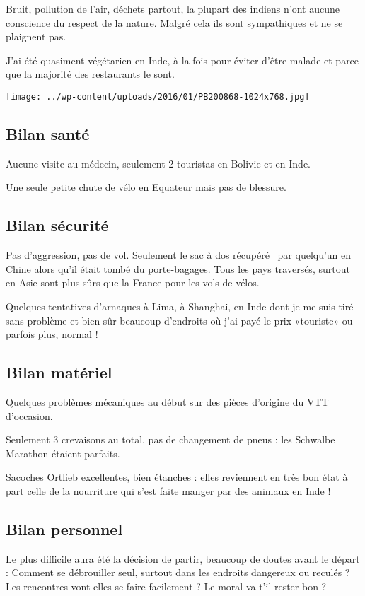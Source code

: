  Bruit, pollution de l'air, déchets partout, la plupart des indiens n'ont aucune conscience du respect de la nature. Malgré cela ils sont sympathiques et ne se plaignent pas. 

 J'ai été quasiment végétarien en Inde, à la fois pour éviter d'être malade et parce que la majorité des restaurants le sont.
\begin{center} \texttt{[image: ../wp-content/uploads/2016/01/PB200868-1024x768.jpg]} \end{center}

 \subsection*{Bilan santé}
 Aucune visite au médecin, seulement 2 touristas en Bolivie et en Inde.

 Une seule petite chute de vélo en Equateur mais pas de blessure.

 \subsection*{Bilan sécurité}
 Pas d'aggression, pas de vol. Seulement le sac à dos \og récupéré \fg\ par quelqu'un en Chine alors qu'il était tombé du porte-bagages. Tous les pays traversés, surtout en Asie sont plus sûrs que la France pour les vols de vélos. 

 Quelques tentatives d'arnaques à Lima, à Shanghai, en Inde dont je me suis tiré sans problème et bien sûr beaucoup d'endroits où j'ai payé le prix «touriste» ou parfois plus, normal !

 \subsection*{Bilan matériel}
 Quelques problèmes mécaniques au début sur des pièces d'origine du VTT d'occasion.

 Seulement 3 crevaisons au total, pas de changement de pneus : les Schwalbe Marathon étaient parfaits. 

 Sacoches Ortlieb excellentes, bien étanches : elles reviennent en très bon état à part celle de la nourriture qui s'est faite manger par des animaux en Inde !

 \subsection*{Bilan personnel} 

 Le plus difficile aura été la décision de partir, beaucoup de doutes avant le départ : Comment se débrouiller seul, surtout dans les endroits dangereux ou reculés ? Les rencontres vont-elles se faire facilement ? Le moral va t'il rester bon ?

